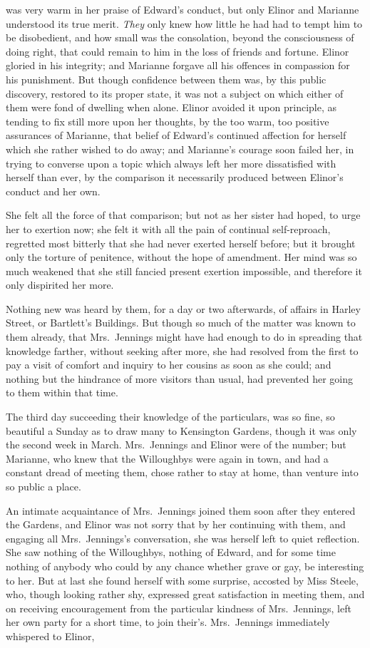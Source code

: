  was very warm in her praise of Edward's
conduct, but only Elinor and Marianne understood its
true merit.  \emph{They} only knew how little he had had to tempt
him to be disobedient, and how small was the consolation,
beyond the consciousness of doing right, that could
remain to him in the loss of friends and fortune.
Elinor gloried in his integrity; and Marianne forgave all
his offences in compassion for his punishment.  But though
confidence between them was, by this public discovery,
restored to its proper state, it was not a subject on
which either of them were fond of dwelling when alone.
Elinor avoided it upon principle, as tending to fix still
more upon her thoughts, by the too warm, too positive
assurances of Marianne, that belief of Edward's continued
affection for herself which she rather wished to do away;
and Marianne's courage soon failed her, in trying
to converse upon a topic which always left her more
dissatisfied with herself than ever, by the comparison
it necessarily produced between Elinor's conduct and her own.

She felt all the force of that comparison; but not
as her sister had hoped, to urge her to exertion now;
she felt it with all the pain of continual self-reproach,
regretted most bitterly that she had never exerted
herself before; but it brought only the torture of penitence,
without the hope of amendment.  Her mind was so much weakened
that she still fancied present exertion impossible,
and therefore it only dispirited her more.

Nothing new was heard by them, for a day or two afterwards,
of affairs in Harley Street, or Bartlett's Buildings.
But though so much of the matter was known to them already,
that Mrs.\ Jennings might have had enough to do in spreading
that knowledge farther, without seeking after more,
she had resolved from the first to pay a visit of comfort
and inquiry to her cousins as soon as she could;
and nothing but the hindrance of more visitors than usual,
had prevented her going to them within that time.

The third day succeeding their knowledge of the
particulars, was so fine, so beautiful a Sunday as to draw
many to Kensington Gardens, though it was only the second
week in March.  Mrs.\ Jennings and Elinor were of the number;
but Marianne, who knew that the Willoughbys were again
in town, and had a constant dread of meeting them,
chose rather to stay at home, than venture into so public
a place.

An intimate acquaintance of Mrs.\ Jennings joined
them soon after they entered the Gardens, and Elinor was
not sorry that by her continuing with them, and engaging
all Mrs.\ Jennings's conversation, she was herself left
to quiet reflection.  She saw nothing of the Willoughbys,
nothing of Edward, and for some time nothing of anybody
who could by any chance whether grave or gay, be interesting
to her.  But at last she found herself with some surprise,
accosted by Miss Steele, who, though looking rather shy,
expressed great satisfaction in meeting them, and on receiving
encouragement from the particular kindness of Mrs.\ Jennings,
left her own party for a short time, to join their's.
Mrs.\ Jennings immediately whispered to Elinor,


